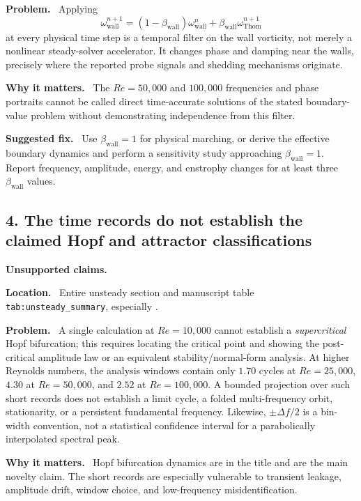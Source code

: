 \documentclass[11pt,a4paper]{article}
\newcommand{\classify}[1]{\textcolor{blue!65!black}{\textbf{#1}}}
\newcommand{\field}[1]{\par\noindent\textbf{#1}\ }
\begin{document}
\field{Problem.} Applying
\[
 \omega_{\mathrm{wall}}^{n+1}
 =(1-\beta_{\mathrm{wall}})\omega_{\mathrm{wall}}^n
 +\beta_{\mathrm{wall}}\omega_{\mathrm{Thom}}^{n+1}
\]
at every physical time step is a temporal filter on the wall vorticity, not merely a nonlinear steady-solver accelerator. It changes phase and damping near the walls, precisely where the reported probe signals and shedding mechanisms originate.

\field{Why it matters.} The $Re=50{,}000$ and $100{,}000$ frequencies and phase portraits cannot be called direct time-accurate solutions of the stated boundary-value problem without demonstrating independence from this filter.

\field{Suggested fix.} Use $\beta_{\mathrm{wall}}=1$ for physical marching, or derive the effective boundary dynamics and perform a sensitivity study approaching $\beta_{\mathrm{wall}}=1$. Report frequency, amplitude, energy, and enstrophy changes for at least three $\beta_{\mathrm{wall}}$ values.

\subsection*{4. The time records do not establish the claimed Hopf and attractor classifications}

\classify{Unsupported claims.}

\field{Location.} Entire unsteady section and manuscript table \texttt{tab:unsteady\_summary}, especially .

\field{Problem.} A single calculation at $Re=10{,}000$ cannot establish a \emph{supercritical} Hopf bifurcation; this requires locating the critical point and showing the post-critical amplitude law or an equivalent stability/normal-form analysis. At higher Reynolds numbers, the analysis windows contain only $1.70$ cycles at $Re=25{,}000$, $4.30$ at $Re=50{,}000$, and $2.52$ at $Re=100{,}000$. A bounded projection over such short records does not establish a limit cycle, a folded multi-frequency orbit, stationarity, or a persistent fundamental frequency. Likewise, $\pm\Delta f/2$ is a bin-width convention, not a statistical confidence interval for a parabolically interpolated spectral peak.

\field{Why it matters.} Hopf bifurcation dynamics are in the title and are the main novelty claim. The short records are especially vulnerable to transient leakage, amplitude drift, window choice, and low-frequency misidentification.
\end{document}
